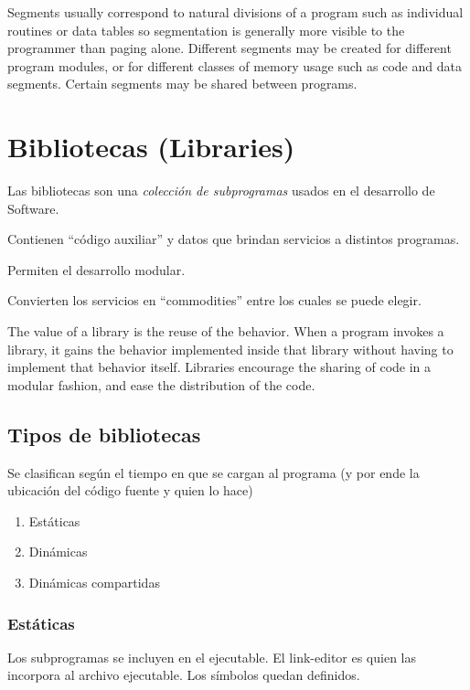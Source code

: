 \documentclass[a4paper, twoside]{article}
\begin{document}
Segments usually correspond to natural divisions of a program such as individual routines or data tables so segmentation is generally more visible to the programmer than paging alone. Different segments may be created for different program modules, or for different classes of memory usage such as code and data segments. Certain segments may be shared between programs.

\newpage
\section{Bibliotecas (Libraries)}
Las bibliotecas son una \emph{colección de subprogramas} usados en el desarrollo de Software.

Contienen ``código auxiliar'' y datos que brindan servicios a distintos programas.

Permiten el desarrollo modular.

Convierten los servicios en ``commodities'' entre los cuales se puede elegir.

The value of a library is the reuse of the behavior. When a program invokes a library, it gains the behavior implemented inside that library without having to implement that behavior itself. Libraries encourage the sharing of code in a modular fashion, and ease the distribution of the code.

\subsection{Tipos de bibliotecas}
Se clasifican según el tiempo en que se cargan al programa (y por ende la ubicación del código fuente y quien lo hace)
\begin{enumerate}
	\item Estáticas
	\item Dinámicas
	\item Dinámicas compartidas
\end{enumerate}

\subsubsection{Estáticas}
Los subprogramas se incluyen en el ejecutable. El link-editor es quien las incorpora al archivo ejecutable. Los símbolos quedan definidos.
\end{document}

